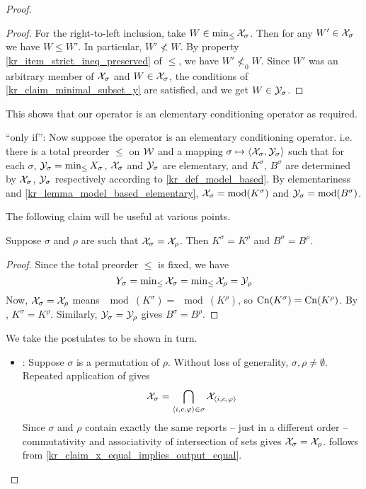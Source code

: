 \begin{proof}
\begin{proof}
        For the right-to-left inclusion, take $W \in \min_{\le}{\mathcal{X}_\sigma}$.
        Then for any $W' \in \mathcal{X}_\sigma$ we have $W \le W'$. In particular, $W'
        \not< W$. By property \cref{kr_item_strict_ineq_preserved} of $\le$,
        we have $W' \not<_0 W$. Since $W'$ was an arbitrary member of
        $\mathcal{X}_\sigma$ and $W \in \mathcal{X}_\sigma$, the conditions of
        \cref{kr_claim_minimal_subset_y} are satisfied, and we get $W \in
        \mathcal{Y}_\sigma$.
    \end{proof}

This shows that our operator is an elementary conditioning operator as
required.

``only if'': Now  suppose the operator is an elementary conditioning operator.
i.e. there is a total preorder $\le$ on $\mathcal{W}$ and a mapping $\sigma \mapsto
\langle {\mathcal{X}_\sigma, \mathcal{Y}_\sigma} \rangle$ such that for each $\sigma$, $\mathcal{Y}_\sigma =
\min_{\le}{X_\sigma}$, $\mathcal{X}_\sigma$ and $\mathcal{Y}_\sigma$ are elementary, and
$K^\sigma$, $B^\sigma$ are determined by $\mathcal{X}_\sigma$, $\mathcal{Y}_\sigma$ respectively
according to \cref{kr_def_model_based}. By elementariness and
\cref{kr_lemma_model_based_elementary}, $\mathcal{X}_\sigma = \operatorname{mod}(K^\sigma)$ and $\mathcal{Y}_\sigma
= \operatorname{mod}(B^\sigma)$.

The following claim will be useful at various points.

    \begin{claim}
        \label{kr_claim_x_equal_implies_output_equal}
        Suppose $\sigma$ and $\rho$ are such that $\mathcal{X}_\sigma = \mathcal{X}_\rho$. Then
        $K^\sigma = K^\rho$ and $B^\sigma = B^\rho$.
    \end{claim}
    \begin{proof}
        Since the total preorder $\le$ is fixed, we have
        \[
            Y_\sigma
            = \min\nolimits_{\le}{\mathcal{X}_\sigma}
            = \min\nolimits_{\le}{\mathcal{X}_\rho}
            = \mathcal{Y}_\rho
        \]
        Now, $\mathcal{X}_\sigma = \mathcal{X}_\rho$ means $\mod(K^\sigma) = \mod(K^\rho)$, so
        $\operatorname{Cn}(K^\sigma) = \operatorname{Cn}(K^\rho)$. By \closure{}, $K^\sigma = K^\rho$.
        Similarly, $\mathcal{Y}_\sigma = \mathcal{Y}_\rho$ gives $B^\sigma = B^\rho$.
    \end{proof}

We take the postulates to be shown in turn.

\begin{itemize}
    \item \rearr{}: Suppose $\sigma$ is a permutation of $\rho$.
          Without loss of generality, $\sigma, \rho \ne \emptyset$. Repeated
          application of \kconj{} gives
          \[
            \mathcal{X}_{\sigma} = \bigcap_{\langle {i, c, \varphi} \rangle \in \sigma}{\mathcal{X}_{\langle {i,
            c, \varphi} \rangle}}
          \]
          Since $\sigma$ and $\rho$ contain exactly the same reports -- just in
          a different order -- commutativity and associativity of intersection
          of sets gives $\mathcal{X}_\sigma = \mathcal{X}_\rho$. \rearr{} follows
          from \cref{kr_claim_x_equal_implies_output_equal}.


\end{itemize}
\end{proof}
